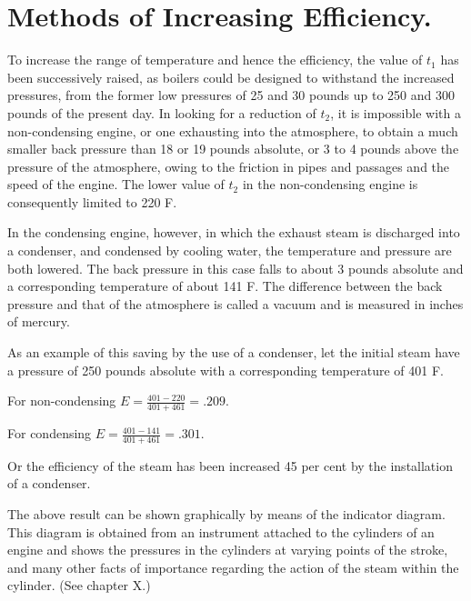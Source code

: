 \documentclass[11pt, a5paper]{book}
\begin{document}
\section{Methods of Increasing Efficiency.}To increase the range of
temperature and hence the efficiency, the value of $t_1$ has been
successively raised, as boilers could be designed to withstand the
increased pressures, from the former low pressures of 25 and 30 pounds
up to 250 and 300 pounds of the present day.  In looking for a
reduction of $t_2$, it is impossible with a non-condensing engine, or
one exhausting into the atmosphere, to obtain a much smaller back
pressure than 18 or 19 pounds absolute, or 3 to 4 pounds above the
pressure of the atmosphere, owing to the friction in pipes and
passages and the speed of the engine.  The lower value of $t_2$ in the
non-condensing engine is consequently limited to 220\degree{} F.\par

In the condensing engine, however, in which the exhaust steam is
discharged into a condenser, and condensed by cooling water, the
temperature and pressure are both lowered.  The back pressure in this
case falls to about 3 pounds absolute and a corresponding temperature
of about 141\degree{} F.  The difference between the back pressure and
that of the atmosphere is called a vacuum and is measured in inches of
mercury.\par

As an example of this saving by the use of a condenser, let the
initial steam have a pressure of 250 pounds absolute with a
corresponding temperature of 401\degree{} F.\par

For non-condensing $E = \frac{401-220}{401+461}=.209$.\par

For condensing $E=\frac{401-141}{401+461}=.301$.\par

Or the efficiency of the steam has been increased 45 per cent by the
installation of a condenser.\par

The above result can be shown graphically by means of the indicator
diagram.  This diagram is obtained from an instrument attached to the
cylinders of an engine and shows the pressures in the cylinders at
varying points of the stroke, and many other facts of importance
regarding the action of the steam within the cylinder. (See chapter
X.)\par
\end{document}
